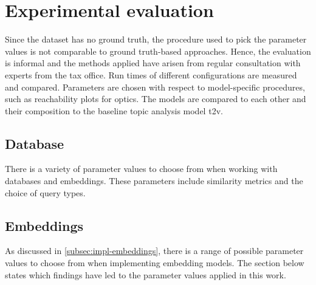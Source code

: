 \chapter{Experimental evaluation}\label{ch:evaluation}

Since the dataset has no ground truth, the procedure used to pick the parameter values is not comparable to ground truth-based approaches.
Hence, the evaluation is informal and the methods applied have arisen from regular consultation with experts from the tax office.
Run times of different configurations are measured and compared.
Parameters are chosen with respect to model-specific procedures, such as reachability plots for \ac{optics}.
The models are compared to each other and their composition to the baseline topic analysis model \ac{t2v}.


 \section{Database}\label{sec:eval-db}
There is a variety of parameter values to choose from when working with databases and embeddings.
These parameters include similarity metrics and the choice of query types.

 

 

 
 
\section{Embeddings}\label{sec:eval-embeddings}
As discussed in \autoref{subsec:impl-embeddings}, there is a range of possible parameter values to choose from when implementing embedding models.
The section below states which findings have led to the parameter values applied in this work.















